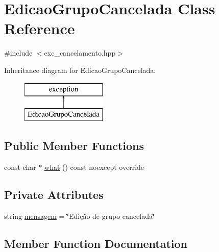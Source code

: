 \hypertarget{classEdicaoGrupoCancelada}{}\section{Edicao\+Grupo\+Cancelada Class Reference}
\label{classEdicaoGrupoCancelada}


{\ttfamily \#include $<$exc\+\_\+cancelamento.\+hpp$>$}

Inheritance diagram for Edicao\+Grupo\+Cancelada\+:\begin{figure}[H]
\begin{center}
\leavevmode
\includegraphics[height=2.000000cm]{classEdicaoGrupoCancelada}
\end{center}
\end{figure}
\subsection*{Public Member Functions}
\begin{DoxyCompactItemize}
\item 
const char $\ast$ \hyperlink{classEdicaoGrupoCancelada_a110bd7cb77b4df99d5a4dd051874ce19}{what} () const noexcept override
\end{DoxyCompactItemize}
\subsection*{Private Attributes}
\begin{DoxyCompactItemize}
\item 
string \hyperlink{classEdicaoGrupoCancelada_a53370c1e225786f8e874b8368468d793}{mensagem} = \char`\"{}Edição de grupo cancelada\char`\"{}
\end{DoxyCompactItemize}


\subsection{Member Function Documentation}
\mbox{\label{classEdicaoGrupoCancelada_a110bd7cb77b4df99d5a4dd051874ce19}} 
